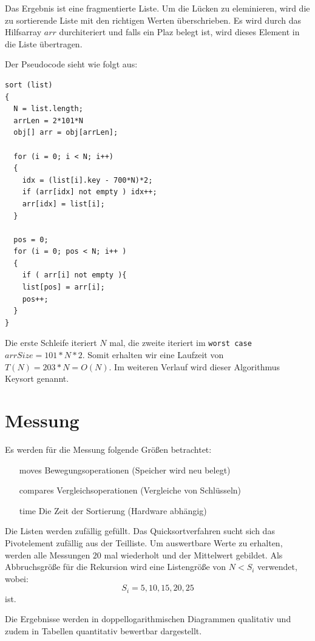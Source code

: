 \documentclass[
   draft=false
  ,paper=a4
  ,twoside=false
  ,fontsize=11pt
  ,headsepline
  ,DIV=11
  ,parskip=full+
  ,titlepage
]{scrartcl} %
\begin{document}
Das Ergebnis ist eine fragmentierte Liste. Um die Lücken zu eleminieren,
wird die zu sortierende Liste mit den richtigen Werten überschrieben.
Es wird durch das Hilfsarray $arr$ durchiteriert und falls ein Plaz 
belegt ist, wird dieses Element in die Liste übertragen. 

Der Pseudocode sieht wie folgt aus:
\begin{lstlisting}
sort (list)
{
  N = list.length;
  arrLen = 2*101*N
  obj[] arr = obj[arrLen];
  
  for (i = 0; i < N; i++)
  {
    idx = (list[i].key - 700*N)*2;
    if (arr[idx] not empty ) idx++; 
    arr[idx] = list[i];
  }
  
  pos = 0;
  for (i = 0; pos < N; i++ )
  {
    if ( arr[i] not empty ){
    list[pos] = arr[i];
    pos++;
  }
}

\end{lstlisting}
Die erste Schleife iteriert $N$ mal, die zweite iteriert im 
\texttt{worst case} $arrSize = 101*N*2$. Somit erhalten wir eine 
Laufzeit von $T(N) = 203*N = O(N)$.
Im weiteren Verlauf wird dieser Algorithmus Keysort genannt.

\section{Messung}

Es werden für die Messung folgende Größen betrachtet:
\begin{itemize}
  \item[moves] Bewegungsoperationen (Speicher wird neu belegt)
  \item[compares] Vergleichsoperationen (Vergleiche von Schlüsseln)
  \item[time] Die Zeit der Sortierung (Hardware abhängig)
\end{itemize}


Die Listen werden zufällig gefüllt. Das Quicksortverfahren sucht sich 
das Pivotelement zufällig aus der Teilliste. 
Um auswertbare Werte zu erhalten, werden alle Messungen $20$ mal wiederholt
und der Mittelwert gebildet. 
Als Abbruchsgröße für die Rekursion wird eine Listengröße von $N < S_i$ 
verwendet, wobei: 
\[
S_i= 5,10,15,20,25
\]
ist.

Die Ergebnisse werden in doppellogarithmischen Diagrammen qualitativ und 
zudem in Tabellen quantitativ bewertbar dargestellt.
\end{document}
